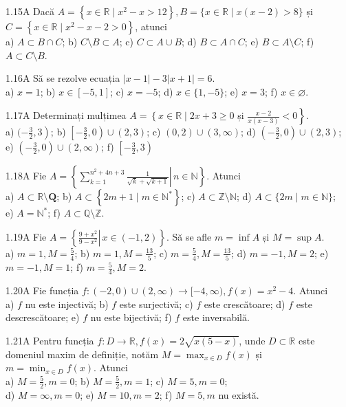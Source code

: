 \documentclass[11pt]{article}
\begin{document}
1.15A Dacă $A=\left\{x \in \mathbb{R} \mid x^{2}-x>12\right\}, B=\{x \in \mathbb{R} \mid x(x-2)>8\}$ și $C=\left\{x \in \mathbb{R} \mid x^{2}-x-2>0\right\}$, atunci\\ a) $A \subset B \cap C$; b) $C \setminus B \subset A$; c) $C \subset A \cup B$; d) $B \subset A \cap C$; e) $B \subset A \setminus C$; f) $A \subset C \setminus B$.

1.16A Să se rezolve ecuația $|x-1|-3|x+1|=6$.\\ a) $x=1$; b) $x \in[-5,1]$; c) $x=-5$; d) $x \in\{1,-5\}$; e) $x=3$; f) $x \in \varnothing$.

1.17A Determinați mulțimea $A=\left\{x \in \mathbb{R} \mid 2 x+3 \geq 0\right.$ și $\left.\frac{x-2}{x(x-3)}<0\right\}$.\\ a) $(\left.-\frac{3}{2}, 3\right)$; b) $\left[-\frac{3}{2}, 0\right) \cup(2,3)$; c) $(0,2) \cup(3, \infty)$; d) $\left(-\frac{3}{2}, 0\right) \cup(2,3)$;\\ e) $\left(-\frac{3}{2}, 0\right) \cup(2, \infty)$; f) $\left[-\frac{3}{2}, 3\right)$

1.18A Fie $A=\left\{\left.\sum_{k=1}^{n^{2}+4 n+3} \frac{1}{\sqrt{k}+\sqrt{k+1}} \right\rvert\, n \in \mathbb{N}\right\}$. Atunci\\ a) $A \subset \mathbb{R} \setminus \mathbf{Q}$; b) $A \subset\left\{2 m+1 \mid m \in \mathbb{N}^{*}\right\}$; c) $A \subset \mathbb{Z} \setminus \mathbb{N}$; d) $A \subset\{2 m \mid m \in \mathbb{N}\}$;\\ e) $A=\mathbb{N}^{*}$; f) $A \subset \mathbb{Q} \setminus \mathbb{Z}$.

1.19A Fie $A=\left\{\left.\frac{9+x^{2}}{9-x^{2}} \right\rvert\, x \in(-1,2)\right\}$. Să se afle $m=\inf A$ și $M=\sup A$.\\ a) $m=1, M=\frac{5}{4}$; b) $m=1, M=\frac{13}{5}$; c) $m=\frac{5}{4}, M=\frac{13}{5}$; d) $m=-1, M=2$; e) $m=-1, M=1$; f) $m=\frac{5}{4}, M=2$.

1.20A Fie funcția $f:(-2,0) \cup(2, \infty) \rightarrow[-4, \infty), f(x)=x^{2}-4$. Atunci\\ a) $f$ nu este injectivă; b) $f$ este surjectivă; c) $f$ este crescătoare; d) $f$ este descrescătoare; e) $f$ nu este bijectivă; f) $f$ este inversabilă.

1.21A Pentru funcția $f: D \rightarrow \mathbb{R}, f(x)=2 \sqrt{x(5-x)}$, unde $D \subset \mathbb{R}$ este domeniul maxim de definiție, notăm $M=\max _{x \in D} f(x)$ și $m=\min _{x \in D} f(x)$. Atunci\\ a) $M=\frac{5}{2}, m=0$; b) $M=\frac{5}{2}, m=1$; c) $M=5, m=0$;\\ d) $M=\infty, m=0$; e) $M=10, m=2$; f) $M=5, m$ nu există.
\end{document}
